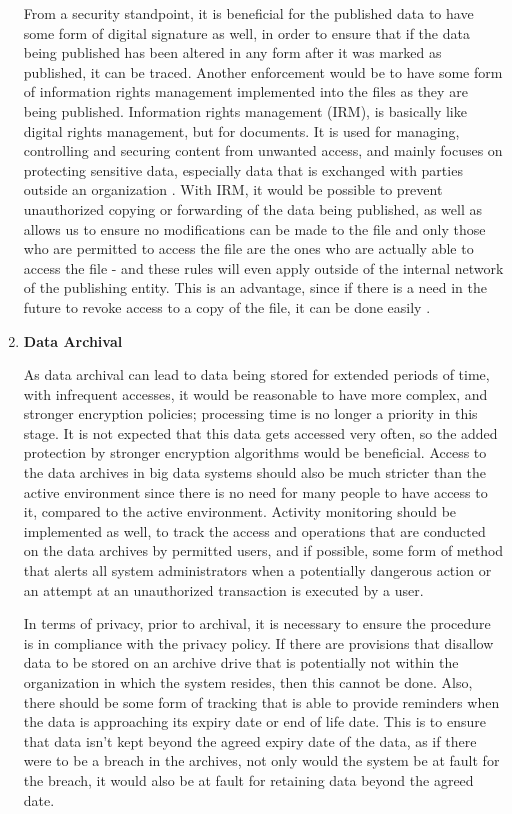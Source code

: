 \documentclass{sigchi}
\begin{document}
\begin{enumerate}
From a security standpoint, it is beneficial for the published data to have some form of digital signature as well, in order to ensure that if the data being published has been altered in any form after it was marked as published, it can be traced. Another enforcement would be to have some form of information rights management implemented into the files as they are being published. Information rights management (IRM), is basically like digital rights management, but for documents. It is used for managing, controlling and securing content from unwanted access, and mainly focuses on protecting sensitive data, especially data that is exchanged with parties outside an organization \cite{irm_rouse}. With IRM, it would be possible to prevent unauthorized copying or forwarding of the data being published, as well as allows us to ensure no modifications can be made to the file and only those who are permitted to access the file are the ones who are actually able to access the file - and these rules will even apply outside of the internal network of the publishing entity. This is an advantage, since if there is a need in the future to revoke access to a copy of the file, it can be done easily \cite{kohgadai_2016}.

\item \textbf{Data Archival}

As data archival can lead to data being stored for extended periods of time, with infrequent accesses, it would be reasonable to have more complex, and stronger encryption policies; processing time is no longer a priority in this stage. It is not expected that this data gets accessed very often, so the added protection by stronger encryption algorithms would be beneficial. Access to the data archives in big data systems should also be much stricter than the active environment since there is no need for many people to have access to it, compared to the active environment. Activity monitoring should be implemented as well, to track the access and operations that are conducted on the data archives by permitted users, and if possible, some form of method that alerts all system administrators when a potentially dangerous action or an attempt at an unauthorized transaction is executed by a user.

In terms of privacy, prior to archival, it is necessary to ensure the procedure is in compliance with the privacy policy. If there are provisions that disallow data to be stored on an archive drive that is potentially not within the organization in which the system resides, then this cannot be done. Also, there should be some form of tracking that is able to provide reminders when the data is approaching its expiry date or end of life date. This is to ensure that data isn't kept beyond the agreed expiry date of the data, as if there were to be a breach in the archives, not only would the system be at fault for the breach, it would also be at fault for retaining data beyond the agreed date.


\end{enumerate}
\end{document}

